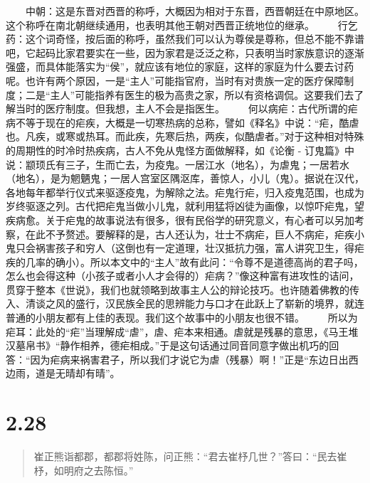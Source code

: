 \documentclass[]{book}
\begin{document}
　　中朝：这是东晋对西晋的称呼，大概因为相对于东晋，西晋朝廷在中原地区。这个称呼在南北朝继续通用，也表明其他王朝对西晋正统地位的继承。
　　行乞药：这个词奇怪，按后面的称呼，虽然我们可以认为尊侯是尊称，但总不能不靠谱吧，它起码比家君要实在一些，因为家君是泛泛之称，只表明当时家族意识的逐渐强盛，而具体能落实为``侯''，就应该有地位的家庭，这样的家庭为什么要去讨药呢。也许有两个原因，一是``主人''可能指官府，当时有对贵族一定的医疗保障制度；二是``主人''可能指养有医生的极为高贵之家，所以有资格调侃。这要我们去了解当时的医疗制度。但我想，主人不会是指医生。
　　何以病疟：古代所谓的疟病不等于现在的疟疾，大概是一切寒热病的总称，譬如《释名》中说：``疟，酷虐也。凡疾，或寒或热耳。而此疾，先寒后热，两疾，似酷虐者。''对于这种相对特殊的周期性的时冷时热疾病，古人不免从鬼怪方面做解释，如《论衡
-
订鬼篇》中说：颛顼氏有三子，生而亡去，为疫鬼。一居江水（地名），为虐鬼；一居若水（地名），是为魍魉鬼；一居人宫室区隅沤库，善惊人，小儿（鬼）。据说在汉代，各地每年都举行仪式来驱逐疫鬼，为解除之法。疟鬼行疟，归入疫鬼范围，也成为岁终驱逐之列。古代把疟鬼当做小儿鬼，就利用猛将凶徒为画像，以惊吓疟鬼，望疾病愈。关于疟鬼的故事说法有很多，很有民俗学的研究意义，有心者可以另加考察，在此不予赘述。要解释的是，古人还认为，壮士不病疟，巨人不病疟，疟疾小鬼只会祸害孩子和穷人（这倒也有一定道理，壮汉抵抗力强，富人讲究卫生，得疟疾的几率的确小）。所以本文中的``主人''故有此问：``令尊不是道德高尚的君子吗，怎么也会得这种（小孩子或者小人才会得的）疟病？''像这种富有进攻性的诘问，贯穿于整本《世说》，我们也就领略到故事主人公的辩论技巧。也许随着佛教的传入、清谈之风的盛行，汉民族全民的思辨能力与口才在此跃上了崭新的境界，就连普通的小朋友都有上佳的表现。我们这个故事中的小朋友也很不错。
　　所以为疟耳：此处的``疟''当理解成``虐''，虐、疟本来相通。虐就是残暴的意思，《马王堆汉墓帛书》``静作相养，德疟相成。''于是这句话通过同音同意字做出机巧的回答：``因为疟病来祸害君子，所以我们才说它为虐（残暴）啊！''正是``东边日出西边雨，道是无晴却有晴''。

\section{2.28}\label{section-74}

\begin{quote}
崔正熊诣都郡，都郡将姓陈，问正熊：``君去崔杼几世？''答曰：``民去崔杼，如明府之去陈恒。''
\end{quote}
\end{document}
